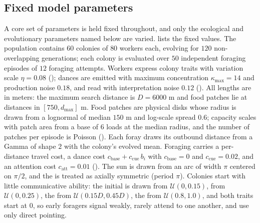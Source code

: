 \subsection{Fixed model parameters}
\label{sec:setup-fixed}
A core set of parameters is held fixed throughout, and only the ecological and
evolutionary parameters named below are varied.  lists the
fixed values. The population contains $60$ colonies of $80$ workers each,
evolving for $120$ non-overlapping generations; each colony is evaluated over
$50$ independent foraging episodes of $12$ foraging attempts. Workers express
colony traits with variation scale $\eta = 0.08$ (); dances are
emitted with maximum concentration $\kappa_{\max} = 14$ and production noise
$0.18$, and read with interpretation noise $0.12$ (). All
lengths are in meters: the maximum search distance is $D = 6000$ m and food
patches lie at distances in $[750, d_{\max}]$ m. Food patches are physical disks
whose radius is drawn from a lognormal of median $150$ m and log-scale spread
$0.6$; capacity scales with patch area from a base of $6$ loads at the median
radius, and the number of patches per episode is Poisson ().
Each foray draws its outbound distance from a Gamma of shape $2$ with the colony's
evolved mean. Foraging carries a per-distance travel cost, a dance cost
$c_{\mathrm{base}} + c_{\mathrm{cue}}\,b_i$ with $c_{\mathrm{base}} = 0$ and
$c_{\mathrm{cue}} = 0.02$, and an attention cost $c_{\mathrm{att}} = 0.01$
(). The sun is drawn from an arc of width $\pi$ centered on
$\pi/2$, and the  is treated as axially symmetric (period $\pi$).
Colonies start with little communicative ability: the initial  is
drawn from $\mathcal{U}(0,0.15)$,  from $\mathcal{U}(0,0.25)$,
the  from $\mathcal{U}(0.15D, 0.45D)$, the  from
$\mathcal{U}(0.8,1.0)$, and both  traits start at $0$, so early
foragers signal weakly, rarely attend to one another, and use only direct
pointing.

